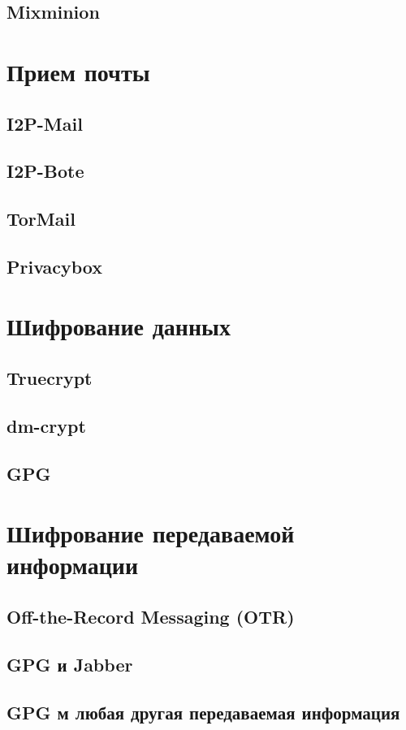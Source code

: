 \subsection{Mixminion}

\section{Прием почты}
\subsection{I2P-Mail}
\subsection{I2P-Bote}
\subsection{TorMail}
\subsection{Privacybox}

\section{Шифрование данных}
\subsection{Truecrypt}
\subsection{dm-crypt}
\subsection{GPG}

\section{Шифрование передаваемой информации}
\subsection{Off-the-Record Messaging (OTR)}
\subsection{GPG и Jabber}
\subsection{GPG м любая другая передаваемая информация}

